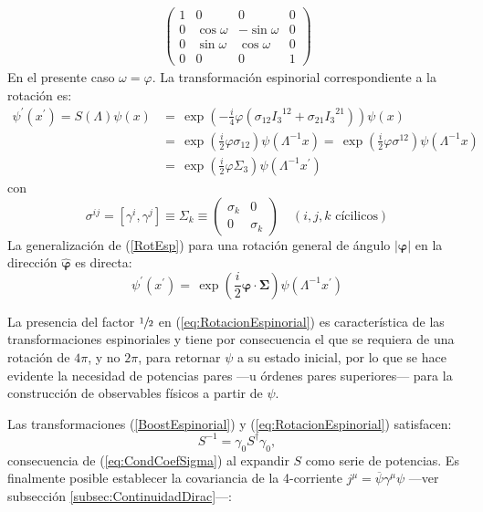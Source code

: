 \begin{example}
\begin{align*}
\begin{pmatrix}
	    1 & 0 & 0 & 0 \\
    0 & \cos{\omega} & -\sin{\omega} & 0 \\
    0& \sin{\omega} & \cos{\omega} & 0 \\
    0 & 0 & 0 & 1
	\end{pmatrix}
	\end{align*}
	En el presente caso $\omega=\varphi$. La transformación espinorial correspondiente a la rotación es:
	\begin{equation}\label{RotEsp}
\begin{aligned}
\psi^{\prime}(x^{\prime})=S(\Lambda)\psi(x)&=\,\exp{\left( -\frac{i}{4}\varphi\left( \sigma_{ 12}{I_{3}}^{12} +\sigma_{21}{I_{3}}^{21}\right) \right)} \psi(x)\\
&=\,\exp{\left( \frac{i}{2}\varphi\sigma_{12} \right)} \psi(\Lambda^{-1} x)=\,\exp{\left( \frac{i}{2}\varphi\sigma^{12} \right)} \psi(\Lambda^{-1} x)\\
&=\,\exp{\left( \frac{i}{2}\varphi \Sigma_3 \right)} \psi(\Lambda^{-1} x^\prime)
\end{aligned}
\end{equation}
con
\begin{equation}\label{SigmaRotacion}
\sigma^{ij}=\left[ \gamma^i,\gamma^j\right]\equiv\Sigma_k\equiv	\begin{pmatrix}
			\sigma_k & 0 \\
			0 & \sigma_k
			\end{pmatrix} \quad (i,j,k \text{ cícilicos})
\end{equation}
La generalización de (\ref{RotEsp}) para una rotación general de ángulo $\left| \bm{\varphi}\right|$ en la dirección $\bm{\hat{\varphi}}$ es directa:
\begin{equation}\label{eq:RotacionEspinorial}
\psi^{\prime}(x^{\prime})=\,\exp{\left( \frac{i}{2}\bm{\varphi}\cdot \bm{\Sigma} \right)} \psi(\Lambda^{-1} x^\prime)
\end{equation}
	\end{example}

La presencia del factor $\sfrac{1}{2}$ en (\ref{eq:RotacionEspinorial}) es característica de las transformaciones espinoriales y tiene por consecuencia el que se requiera de una rotación de $4\pi$, y no $2\pi$, para retornar $\psi$ a su estado inicial, por lo que se hace evidente la necesidad de potencias pares ---u órdenes pares superiores--- para la construcción de observables físicos a partir de $\psi$. 

Las transformaciones (\ref{BoostEspinorial}) y (\ref{eq:RotacionEspinorial}) satisfacen: \begin{equation}\label{eq:SHerm}
S^{-1}=\gamma_0 S^{\dagger} \gamma_0,
\end{equation}
consecuencia de (\ref{eq:CondCoefSigma}) al expandir $S$ como serie de potencias.
Es finalmente posible establecer la covariancia de la 4-corriente $j^{\mu}=\overline{\psi}\gamma^{\mu}\psi$ ---ver subsección \ref{subsec:ContinuidadDirac}---:

